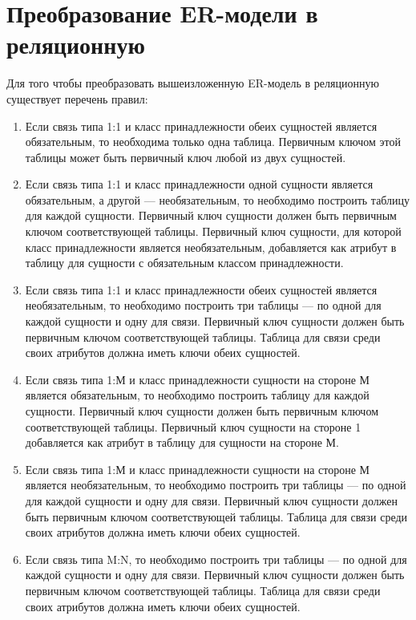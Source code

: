 \documentclass[14pt,a4paper,russian]{extreport}
\begin{document}
\section{Преобразование ER-модели в реляционную}
Для того чтобы преобразовать вышеизложенную ER-модель в реляционную существует перечень
правил:
\begin{enumerate}
    \item Если связь типа 1:1 и класс принадлежности обеих сущностей является обязательным,
        то необходима только одна таблица. Первичным ключом этой таблицы может быть первичный
        ключ любой из двух сущностей.
    \item Если связь типа 1:1 и класс принадлежности одной сущности является обязательным, а
        другой — необязательным, то необходимо построить таблицу для каждой сущности.
        Первичный ключ сущности должен быть первичным ключом соответствующей таблицы.
        Первичный ключ сущности, для которой класс принадлежности является необязательным,
        добавляется как атрибут в таблицу для сущности с обязательным классом принадлежности.
    \item Если связь типа 1:1 и класс принадлежности обеих сущностей является необязательным,
        то необходимо построить три таблицы — по одной для каждой сущности и одну для связи.
        Первичный ключ сущности должен быть первичным ключом соответствующей таблицы.
        Таблица для связи среди своих атрибутов должна иметь ключи обеих сущностей.
    \item Если связь типа 1:М и класс принадлежности сущности на стороне М является обязательным,
        то необходимо построить таблицу для каждой сущности. Первичный ключ сущности должен
        быть первичным ключом соответствующей таблицы. Первичный ключ сущности на стороне 1
        добавляется как атрибут в таблицу для сущности на стороне М.
    \item Если связь типа 1:М и класс принадлежности сущности на стороне М является необязательным,
        то необходимо построить три таблицы — по одной для каждой сущности и одну для связи.
        Первичный ключ сущности должен быть первичным ключом соответствующей таблицы.
        Таблица для связи среди своих атрибутов должна иметь ключи обеих сущностей.
    \item Если связь типа M:N, то необходимо построить три таблицы — по одной для каждой
        сущности и одну для связи. Первичный ключ сущности должен быть первичным ключом
        соответствующей таблицы. Таблица для связи среди своих атрибутов должна иметь ключи обеих
        сущностей.\cite{transform}
\end{enumerate}
\end{document}
